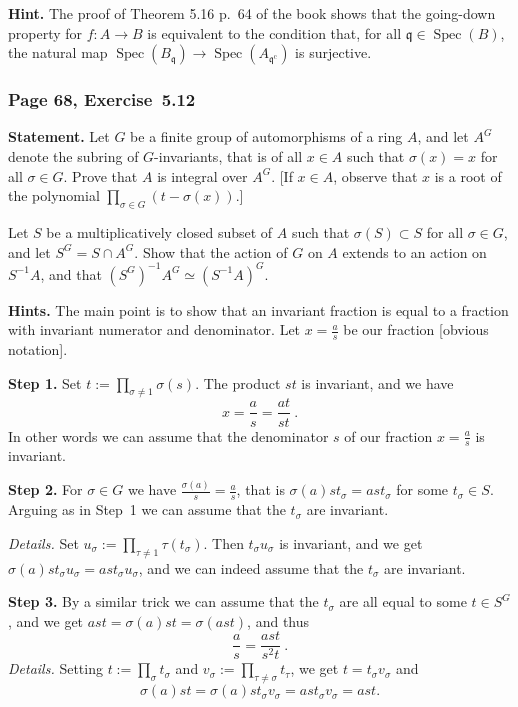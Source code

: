 \documentclass[12pt,letterpaper]{article}%
\newcommand{\oo}{\operatorname}\newcommand{\ooo}{\operatorname*}
\newcommand{\mf}{\mathfrak}
\newcommand{\qqq}{\mf q}
\newcommand{\Spec}{\operatorname{Spec}}\newcommand{\Sp}{\operatorname{Spec}}
\newcommand{\nn}{\noindent}
\begin{document}
\nn\textbf{Hint.} The proof of Theorem 5.16 p.~64 of the book shows that the going-down property for $f:A\to B$ is equivalent to the condition that, for all $\qqq\in\Spec(B)$, the natural map $\Spec(B_\qqq)\to\Spec(A_{\qqq^{\oo c}})$ is surjective. 

\subsubsection{Page 68, Exercise~5.12}\label{5.12}%

\textbf{Statement.} Let $G$ be a finite group of automorphisms of a ring $A$, and let $A^G$ denote the subring of $G$-invariants, that is of all $x\in A$ such that $\sigma(x)=x$ for all $\sigma\in G$. Prove that $A$ is integral over $A^G$. [If $x\in A$, observe that $x$ is a root of the polynomial $\prod_{\sigma\in G}(t-\sigma(x))$.]

Let $S$ be a multiplicatively closed subset of $A$ such that $\sigma(S)\subset S$ for all $\sigma\in G$, and let $S^G=S\cap A^G$. Show that the action of $G$ on $A$ extends to an action on $S^{-1}A$, and that $(S^G)^{-1}A^G\simeq(S^{-1}A)^G$.

\nn\textbf{Hints.} The main point is to show that an invariant fraction is equal to a fraction with invariant numerator and denominator. Let $x=\frac as$ be our fraction [obvious notation]. 

\nn\textbf{Step 1.} Set $
t:=\prod_{\sigma\ne1}\sigma(s)$. The product $st$ is invariant, and we have 
$$
x=\frac{a}{s}=\frac{at}{st}\ .
$$ 
In other words we can assume that the denominator $s$ of our fraction $x=\frac as$ is invariant.

\nn\textbf{Step 2.} For $\sigma\in G$ we have $\frac{\sigma(a)}s=\frac as$, that is $\sigma(a)st_\sigma=ast_\sigma$ for some $t_\sigma\in S$. Arguing as in Step~1 we can assume that the $t_\sigma$ are invariant. 

\nn\emph{Details.} Set $u_\sigma:=\prod_{\tau\ne1}\tau(t_\sigma)$. Then $t_\sigma u_\sigma$ is invariant, and we get $\sigma(a)st_\sigma u_\sigma=ast_\sigma u_\sigma$, and we can indeed assume that the $t_\sigma$ are invariant.

\nn\textbf{Step 3.} By a similar trick we can assume that the $t_\sigma$ are all equal to some $t\in S^G$, and we get $ast=\sigma(a)st=\sigma(ast)$, and thus 
$$
\frac{a}{s}=\frac{ast}{s^2t}\ .
$$ 
\nn\emph{Details.} Setting $t:=\prod_\sigma t_\sigma$ and $v_\sigma:=\prod_{\tau\ne\sigma}t_\tau$, we get $t=t_\sigma v_\sigma$ and 
$$
\sigma(a)st=\sigma(a)st_\sigma v_\sigma=ast_\sigma v_\sigma=ast.
$$ 
\end{document}
